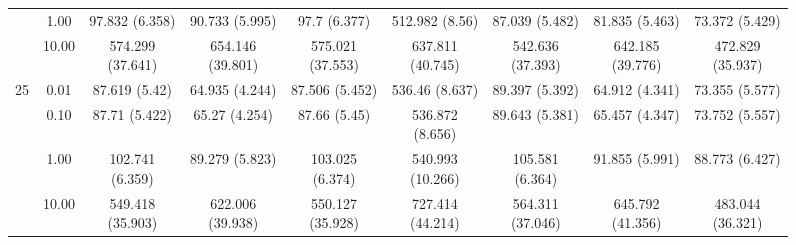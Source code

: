 \documentclass[11pt]{article}
\theoremstyle{definition}
\begin{document}
\begin{sidewaysfigure}
\begin{tabular}{cc|ccc|cccc}
    & 1.00 & 97.832 (6.358) & 90.733 (5.995) & 97.7 (6.377) & 512.982 (8.56) & 87.039 (5.482) & 81.835 (5.463) & 73.372 (5.429) \\ 
  & 10.00 & 574.299 (37.641) & 654.146 (39.801) & 575.021 (37.553) & 637.811 (40.745) & 542.636 (37.393) & 642.185 (39.776) & 472.829 (35.937)  \\[.3cm]  
   \multirow{4}{*}{25} & 0.01 & 87.619 (5.42) & 64.935 (4.244) & 87.506 (5.452) & 536.46 (8.637) & 89.397 (5.392) & 64.912 (4.341) & 73.355 (5.577) \\ 
    & 0.10 & 87.71 (5.422) & 65.27 (4.254) & 87.66 (5.45) & 536.872 (8.656) & 89.643 (5.381) & 65.457 (4.347) & 73.752 (5.557) \\ 
   & 1.00 & 102.741 (6.359) & 89.279 (5.823) & 103.025 (6.374) & 540.993 (10.266) & 105.581 (6.364) & 91.855 (5.991) & 88.773 (6.427) \\ 
   & 10.00 & 549.418 (35.903) & 622.006 (39.938) & 550.127 (35.928) & 727.414 (44.214) & 564.311 (37.046) & 645.792 (41.356) & 483.044 (36.321) \\
\end{tabular}
\end{sidewaysfigure}
\end{document}

